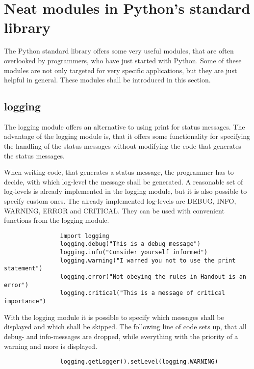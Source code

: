 	\section{Neat modules in Python's standard library}
		The Python standard library offers some very useful modules, that are often overlooked by programmers, who have just started with Python.
		Some of these modules are not only targeted for very specific applications, but they are just helpful in general.
		These modules shall be introduced in this section.

		\subsection{logging}
			\label{logging}
			The logging module offers an alternative to using {\normalfont \ttfamily print} for status messages.
			The advantage of the logging module is, that it offers some functionality for specifying the handling of the status messages without modifying the code that generates the status messages.

			When writing code, that generates a status message, the programmer has to decide, with which log-level the message shall be generated.
			A reasonable set of log-levels is already implemented in the logging module, but it is also possible to specify custom ones.
			The already implemented log-levels are {\normalfont \ttfamily DEBUG}, {\normalfont \ttfamily INFO}, {\normalfont \ttfamily WARNING}, {\normalfont \ttfamily ERROR} and {\normalfont \ttfamily CRITICAL}.
			They can be used with convenient functions from the logging module.
			\begin{verbatim}
				import logging
				logging.debug("This is a debug message")
				logging.info("Consider yourself informed")
				logging.warning("I warned you not to use the print statement")
				logging.error("Not obeying the rules in Handout is an error")
				logging.critical("This is a message of critical importance")
			\end{verbatim}

			With the logging module it is possible to specify which messages shall be displayed and which shall be skipped.
			The following line of code sets up, that all debug- and info-messages are dropped, while everything with the priority of a warning and more is displayed.
			\begin{verbatim}
				logging.getLogger().setLevel(logging.WARNING)
			\end{verbatim}

